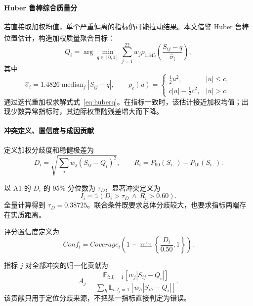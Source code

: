 \documentclass[bwprint]{gmcmthesis}
\newcommand{\E}{\mathbb{E}}
\numberwithin{equation}{section}
\numberwithin{figure}{section}
\numberwithin{table}{section}
\begin{document}
        \paragraph{Huber 鲁棒综合质量分}
        若直接取加权均值，单个严重偏离的指标仍可能拉动结果。本文借鉴 Huber 鲁棒位置估计\textsuperscript{\cite{huber1964robust}}，构造加权质量聚合目标：
        \begin{equation}
        Q_i=\arg\min_{q\in[0,1]}\sum_{j=1}^{22}w_j
        \rho_{1.345}\!\left(\frac{S_{ij}-q}{\widehat\sigma_i}\right),
        \label{eq:huberq}
        \end{equation}
        其中
        \begin{equation}
        \widehat\sigma_i=1.4826\operatorname{median}_{j}|S_{ij}-q|,
        \qquad
        \rho_c(u)=\begin{cases}
        \tfrac12u^2,&|u|\le c,\\
        c|u|-\tfrac12c^2,&|u|>c.
        \end{cases}
        \label{eq:huber}
        \end{equation}
        通过迭代重加权求解式式~\eqref{eq:huberq}。在指标一致时，该估计接近加权均值；出现少数异常指标时，其边际权重随残差增大而下降。

        
        \paragraph{冲突定义、置信度与成因贡献}
        定义加权分歧度和稳健极差为
        \begin{equation}
        D_i=\sqrt{\sum_jw_j(S_{ij}-Q_i)^2},\qquad
        R_i=P_{90}(S_{i\cdot})-P_{10}(S_{i\cdot}).
        \label{eq:disagreement}
        \end{equation}
        
        以 A1 的 $D_i$ 的 95\% 分位数为 $\tau_D$，显著冲突定义为
        \begin{equation}
        I_i=\mathds{1}(D_i>\tau_D\ \land\ R_i>0.60).
        \label{eq:conflict}
        \end{equation}
        全量计算得到 $\tau_D=0.38725$。联合条件既要求总体分歧较大，也要求指标两端存在实质距离。
        
        评分置信度定义为
        \begin{equation}
        Conf_i=Coverage_i\left(1-\min\left\{\frac{D_i}{0.50},1\right\}\right).
        \label{eq:confidence}
        \end{equation}
        
        指标 $j$ 对全部冲突的归一化贡献为
        \begin{equation}
        A_j=
        \frac{\E_{i:I_i=1}[w_j|S_{ij}-Q_i|]}
        {\sum_h\E_{i:I_i=1}[w_h|S_{ih}-Q_i|]}.
        \label{eq:attribution}
        \end{equation}
        该贡献只用于定位分歧来源，不把某一指标直接判定为错误。
\end{document}
